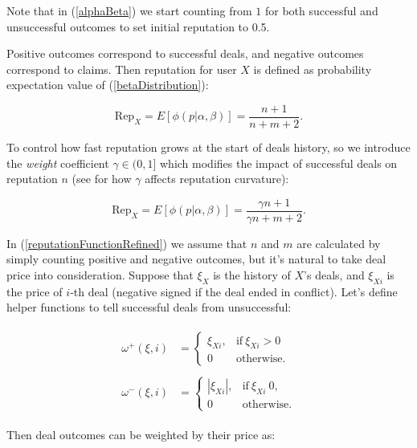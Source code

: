 \documentclass[11pt]{article}
\begin{document}
Note that in (\ref{alphaBeta}) we start counting from $ 1 $ for both successful and unsuccessful outcomes to set initial reputation to 0.5.

Positive outcomes correspond to successful deals, and negative outcomes correspond to claims. Then  reputation for user $ X $ is defined as probability expectation value of (\ref{betaDistribution}):

\begin{equation} \label{reputationFunction}
\text{Rep}_{X} = E[\phi(p | \alpha, \beta)] = \frac{n + 1}{n + m + 2}.
\end{equation}

To control how fast reputation grows at the start of deals history, so we introduce the \textit{weight} coefficient $ \gamma \in (0, 1] $ which modifies the impact of successful deals on reputation $ n $ (see \cite{josang2002beta} for how $ \gamma $ affects reputation curvature):

\begin{equation} \label{reputationFunctionRefined}
\text{Rep}_{X} = E[\phi(p | \alpha, \beta)] = \frac{\gamma n + 1}{\gamma n + m + 2}.
\end{equation}

In (\ref{reputationFunctionRefined}) we assume that $ n $ and $ m $ are calculated by simply counting positive and negative outcomes, but it's natural to take deal price into consideration. Suppose that $ \xi_{X} $ is the history of $ X $'s deals, and $ \xi_{Xi} $ is the price of $ i $-th deal (negative signed if the deal ended in conflict). Let's define helper functions to tell successful deals from unsuccessful:

\begin{align}
\begin{split}
\omega^{+}(\xi, i) {}& = \begin{cases} \xi_{Xi}, & \text{if}\ \xi_{Xi} > 0\, \\ 0 & \mbox{otherwise.} \end{cases}
\end{split} \\
\begin{split}
\omega^{-}(\xi, i) {}& = \begin{cases} |\xi_{Xi}|, & \text{if}\ \xi_{Xi}\  0, \\ 0 & \mbox{otherwise.} \end{cases}
\end{split}
\end{align}

Then deal outcomes can be weighted by their price as:
\end{document}
